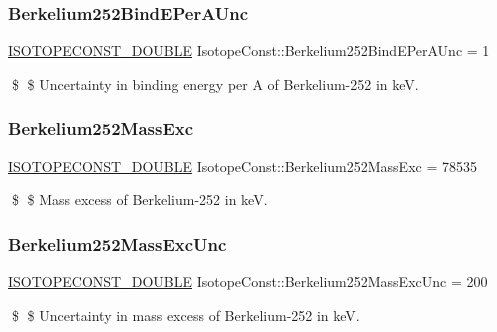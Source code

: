 \subsubsection{\texorpdfstring{Berkelium252\+Bind\+E\+Per\+A\+Unc}{Berkelium252BindEPerAUnc}}
{\footnotesize\ttfamily \mbox{\hyperlink{group___isotope_const-_macros_ga8f45a7272ce02c0b4c65c44636ed719a}{I\+S\+O\+T\+O\+P\+E\+C\+O\+N\+S\+T\+\_\+\+D\+O\+U\+B\+LE}} Isotope\+Const\+::\+Berkelium252\+Bind\+E\+Per\+A\+Unc = 1}

\$ \$ Uncertainty in binding energy per A of Berkelium-\/252 in keV. \mbox{\label{group___isotope_const-_berkelium-_bk252_gac966a9a025c016c9f0ecfa1f81afb937}} 
\subsubsection{\texorpdfstring{Berkelium252\+Mass\+Exc}{Berkelium252MassExc}}
{\footnotesize\ttfamily \mbox{\hyperlink{group___isotope_const-_macros_ga8f45a7272ce02c0b4c65c44636ed719a}{I\+S\+O\+T\+O\+P\+E\+C\+O\+N\+S\+T\+\_\+\+D\+O\+U\+B\+LE}} Isotope\+Const\+::\+Berkelium252\+Mass\+Exc = 78535}

\$ \$ Mass excess of Berkelium-\/252 in keV. \mbox{\label{group___isotope_const-_berkelium-_bk252_gaa3ada92f220420184f042019f76c5bdf}} 
\subsubsection{\texorpdfstring{Berkelium252\+Mass\+Exc\+Unc}{Berkelium252MassExcUnc}}
{\footnotesize\ttfamily \mbox{\hyperlink{group___isotope_const-_macros_ga8f45a7272ce02c0b4c65c44636ed719a}{I\+S\+O\+T\+O\+P\+E\+C\+O\+N\+S\+T\+\_\+\+D\+O\+U\+B\+LE}} Isotope\+Const\+::\+Berkelium252\+Mass\+Exc\+Unc = 200}

\$ \$ Uncertainty in mass excess of Berkelium-\/252 in keV. \mbox{\label{group___isotope_const-_berkelium-_bk252_ga30025d35f83f5d60290fec9f978f945a}} 
